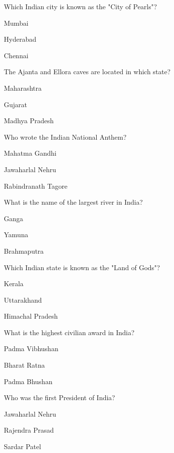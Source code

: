 \begin{enhancedmcq}{Which Indian city is known as the "City of Pearls"?}
\item Mumbai
\item Hyderabad
\item Chennai

\end{enhancedmcq}
\begin{enhancedmcq}{The Ajanta and Ellora caves are located in which state?}
\item Maharashtra
\item Gujarat
\item Madhya Pradesh

\end{enhancedmcq}
\begin{enhancedmcq}{Who wrote the Indian National Anthem?}
\item Mahatma Gandhi
\item Jawaharlal Nehru
\item Rabindranath Tagore

\end{enhancedmcq}
\begin{enhancedmcq}{What is the name of the largest river in India?}
\item Ganga
\item Yamuna
\item Brahmaputra

\end{enhancedmcq}
\begin{enhancedmcq}{Which Indian state is known as the "Land of Gods"?}
\item Kerala
\item Uttarakhand
\item Himachal Pradesh

\end{enhancedmcq}
\begin{enhancedmcq}{What is the highest civilian award in India?}
\item Padma Vibhushan
\item Bharat Ratna
\item Padma Bhushan

\end{enhancedmcq}
\begin{enhancedmcq}{Who was the first President of India?}
\item Jawaharlal Nehru
\item Rajendra Prasad
\item Sardar Patel

\end{enhancedmcq}
